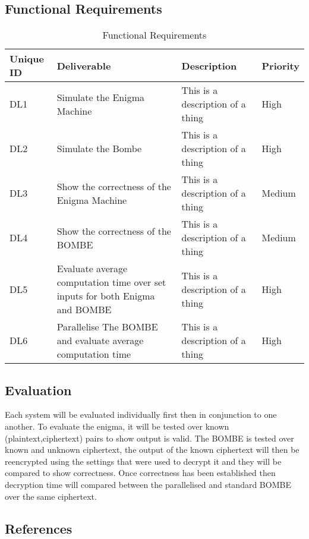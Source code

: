 \documentclass[12pt,a4paper]{article}
\begin{document}
\subsection{Functional Requirements}

\begin{table}[htb]
\centering
\caption{Functional Requirements}
\vspace*{6pt}
\label{units}
\begin{tabular}{ |p{3cm}|p{3cm}|p{3cm}|p{3cm}| }\hline\hline
Unique ID & Deliverable & Description & Priority \\ \hline
DL1 & Simulate the Enigma Machine & This is a description of a thing & High \\ \hline
DL2 & Simulate the Bombe & This is a description of a thing & High \\ \hline
DL3 & Show the correctness of the Enigma Machine & This is a description of a thing & Medium \\ \hline
DL4 & Show the correctness of the BOMBE & This is a description of a thing & Medium \\ \hline
DL5 & Evaluate average computation time over set inputs for both Enigma and BOMBE & This is a description of a thing & High \\ \hline
DL6 & Parallelise The BOMBE and evaluate average computation time & This is a description of a thing & High \\ \hline
\end{tabular}
\end{table}

\subsection{Evaluation}

Each system will be evaluated individually first then in conjunction to one another. To evaluate the enigma, it will be tested over known (plaintext,ciphertext) pairs to show output is valid. The BOMBE is tested over known and unknown ciphertext, the output of the known ciphertext will then be reencrypted using the settings that were used to decrypt it and they will be compared to show correctness. Once correctness has been established then decryption time will compared between the parallelised and standard BOMBE over the same ciphertext.

\subsection{References}


\end{document}
